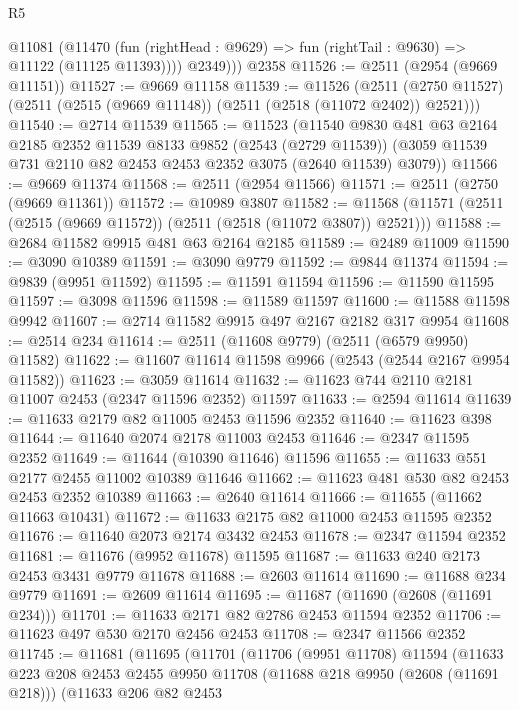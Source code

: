\begin{lexlean}{R5}
\begin{coremodule}
        @11081
          (@11470 (fun (rightHead : @9629) => fun (rightTail : @9630) => @11122 (@11125 @11393))))
          @2349)))
    @2358
@11526 := @2511 (@2954 (@9669 @11151))
@11527 := @9669 @11158
@11539 := @11526
    (@2511 (@2750 @11527) (@2511 (@2515 (@9669 @11148)) (@2511 (@2518 (@11072 @2402)) @2521)))
@11540 := @2714 @11539
@11565 := @11523
    (@11540
      @9830
      @481
      @63
      @2164
      @2185
      @2352
      @11539
      @8133
      @9852
      (@2543 (@2729 @11539))
      (@3059 @11539 @731 @2110 @82 @2453 @2453 @2352 @3075 (@2640 @11539) @3079))
@11566 := @9669 @11374
@11568 := @2511 (@2954 @11566)
@11571 := @2511 (@2750 (@9669 @11361))
@11572 := @10989 @3807
@11582 := @11568 (@11571 (@2511 (@2515 (@9669 @11572)) (@2511 (@2518 (@11072 @3807)) @2521)))
@11588 := @2684 @11582 @9915 @481 @63 @2164 @2185
@11589 := @2489 @11009
@11590 := @3090 @10389
@11591 := @3090 @9779
@11592 := @9844 @11374
@11594 := @9839 (@9951 @11592)
@11595 := @11591 @11594
@11596 := @11590 @11595
@11597 := @3098 @11596
@11598 := @11589 @11597
@11600 := @11588 @11598 @9942
@11607 := @2714 @11582 @9915 @497 @2167 @2182 @317 @9954
@11608 := @2514 @234
@11614 := @2511 (@11608 @9779) (@2511 (@6579 @9950) @11582)
@11622 := @11607 @11614 @11598 @9966 (@2543 (@2544 @2167 @9954 @11582))
@11623 := @3059 @11614
@11632 := @11623 @744 @2110 @2181 @11007 @2453 (@2347 @11596 @2352) @11597
@11633 := @2594 @11614
@11639 := @11633 @2179 @82 @11005 @2453 @11596 @2352
@11640 := @11623 @398
@11644 := @11640 @2074 @2178 @11003 @2453
@11646 := @2347 @11595 @2352
@11649 := @11644 (@10390 @11646) @11596
@11655 := @11633 @551 @2177 @2455 @11002 @10389 @11646
@11662 := @11623 @481 @530 @82 @2453 @2453 @2352 @10389
@11663 := @2640 @11614
@11666 := @11655 (@11662 @11663 @10431)
@11672 := @11633 @2175 @82 @11000 @2453 @11595 @2352
@11676 := @11640 @2073 @2174 @3432 @2453
@11678 := @2347 @11594 @2352
@11681 := @11676 (@9952 @11678) @11595
@11687 := @11633 @240 @2173 @2453 @3431 @9779 @11678
@11688 := @2603 @11614
@11690 := @11688 @234 @9779
@11691 := @2609 @11614
@11695 := @11687 (@11690 (@2608 (@11691 @234)))
@11701 := @11633 @2171 @82 @2786 @2453 @11594 @2352
@11706 := @11623 @497 @530 @2170 @2456 @2453
@11708 := @2347 @11566 @2352
@11745 := @11681
    (@11695
      (@11701
        (@11706
          (@9951 @11708)
          @11594
          (@11633
            @223
            @208
            @2453
            @2455
            @9950
            @11708
            (@11688 @218 @9950 (@2608 (@11691 @218)))
            (@11633
              @206
              @82
              @2453

\end{coremodule}
\end{lexlean}
